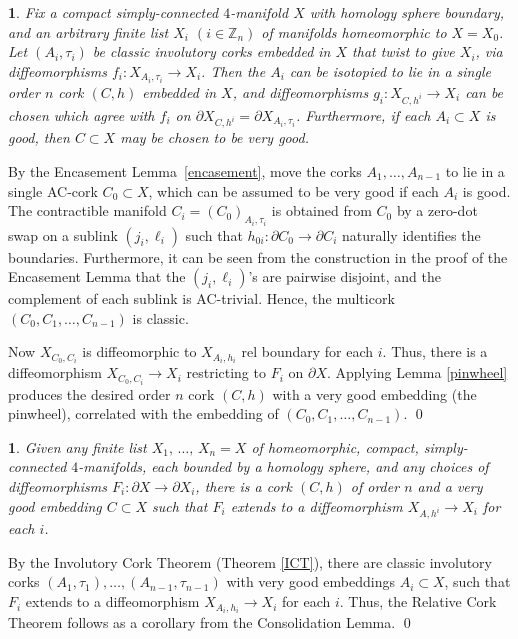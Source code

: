 \documentclass[11pt]{amsart}
\newcommand{\thistheoremname}{}
\newtheorem{genericthm}[theorem]{\thistheoremname}
\newenvironment{namedtheorem}[1]
  {\renewcommand{\thistheoremname}{#1}%
   \begin{genericthm}}
  {\end{genericthm}}
\theoremstyle{definition}
\newcommand{\lemref}[1]{Lemma~\ref{#1}}
\newcommand{\bz}{\mathbb Z}
\newcommand{\del}{\partial}
\newcommand{\ac}{\textup{AC}}
\begin{document}
\begin{namedtheorem}{Consolidation Lemma}\label{consolidation} 
Fix a compact simply-connected $4$-manifold $X$ with homology sphere boundary, and an arbitrary finite list $X_i$ $(i\in\bz_n)$ of manifolds homeomorphic to $X = X_0$.  Let $(A_i, \tau_i)$ be classic involutory corks embedded in $X$ that twist to give $X_i$, via diffeomorphisms $f_i\colon X_{A_i,\tau_i} \to X_i$.  Then the $A_i$ can be isotopied to lie in a single order $n$ cork $(C,h)$ embedded in $X$, and diffeomorphisms $g_i\colon X_{C,h^i} \to X_i$ can be chosen which agree with $f_i$ on $\del X_{C,h^i}= \del X_{A_i,\tau_i}$. Furthermore, if each $A_i \subset X$ is good, then $C\subset X$ may be chosen to be very good.
\end{namedtheorem}  

\proof By the Encasement \lemref{encasement}, move the corks $A_1, \dots, A_{n-1}$ to lie in a single AC-cork $C_0 \subset X$, which can be assumed to be very good if each $A_i$ is good. The contractible manifold $C_i= (C_0)_{A_i, \tau_i}$ is obtained from $C_0$ by a zero-dot swap on a sublink $(j_i, \ell_i)$ such that $h_{0i} \colon \del C_0 \to \del C_i$ naturally identifies the boundaries. Furthermore, it can be seen from the construction in the proof of the Encasement Lemma that the $(j_i,\ell_i)$'s are pairwise disjoint, and the complement of each sublink is \ac-trivial.  Hence, the multicork $(C_0, C_1, \dots, C_{n-1})$ is classic.

Now $X_{C_0, C_i}$ is diffeomorphic to $X_{A_i,h_i}$ rel boundary for each $i$. Thus, there is a diffeomorphism $X_{C_0, C_i} \to X_i$ restricting to $F_i$ on $\del X$. Applying Lemma \ref{pinwheel} produces the desired order $n$ cork $(C,h)$ with a very good embedding (the pinwheel), correlated with the embedding of $(C_0, C_1, \dots, C_{n-1})$. 
\qed 

\begin{namedtheorem}{Relative Finite Cork Theorem} \label{rfct}
Given any finite list $X_1,\,\dots,\,X_{n}=X$ of homeomorphic, compact, simply-connected $4$-manifolds, each bounded by a homology sphere, and any choices of diffeomorphisms $F_i\colon\del X \to \del X_i$, there is a cork $(C,h)$ of order $n$ and a very good embedding $C \subset X$ such that $F_i$ extends to a diffeomorphism $X_{A,h^i} \to X_i$ for each $i$.
\end{namedtheorem} 

\proof By the Involutory Cork Theorem (Theorem \ref{ICT}), there are classic involutory corks \break $(A_1, \tau_1), \dots, (A_{n-1}, \tau_{n-1})$  with very good embeddings $A_i \subset X$, such that $F_i$ extends to a diffeomorphism $X_{A_i,h_i} \to X_i$ for each $i$. Thus, the Relative Cork Theorem follows as a corollary from the Consolidation Lemma. \qed 
\end{document}
